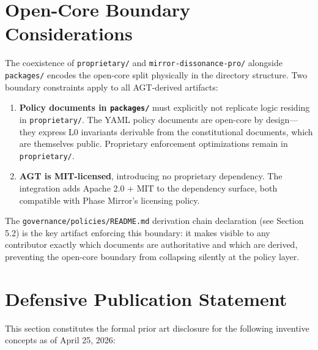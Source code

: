 \documentclass[12pt,a4paper]{article}
\theoremstyle{definition}
\theoremstyle{remark}
\begin{document}
\section{Open-Core Boundary Considerations}

The coexistence of \texttt{proprietary/} and \texttt{mirror-dissonance-pro/}
alongside \texttt{packages/} encodes the open-core split physically in the
directory structure. Two boundary constraints apply to all AGT-derived artifacts:

\begin{enumerate}
  \item \textbf{Policy documents in \texttt{packages/}} must explicitly not replicate
    logic residing in \texttt{proprietary/}. The YAML policy documents are
    open-core by design---they express L0 invariants derivable from the
    constitutional documents, which are themselves public. Proprietary
    enforcement optimizations remain in \texttt{proprietary/}.

  \item \textbf{AGT is MIT-licensed}, introducing no proprietary dependency.
    The integration adds Apache 2.0 + MIT to the dependency surface, both
    compatible with Phase Mirror's licensing policy.
\end{enumerate}

The \texttt{governance/policies/README.md} derivation chain declaration
(see Section 5.2) is the key artifact enforcing this boundary: it makes
visible to any contributor exactly which documents are authoritative and
which are derived, preventing the open-core boundary from collapsing silently
at the policy layer.


\section{Defensive Publication Statement}

This section constitutes the formal prior art disclosure for the following
inventive concepts as of April 25, 2026:
\end{document}
